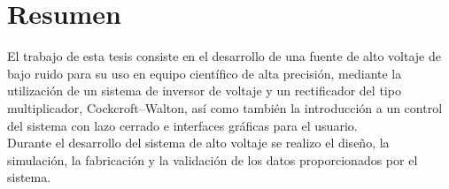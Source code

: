 



\chapter{Resumen} %

El trabajo de esta tesis consiste en el desarrollo de una fuente de alto voltaje de bajo ruido para su uso en equipo científico de alta precisión, mediante la utilización  de un sistema de inversor de voltaje y un rectificador del tipo multiplicador, Cockcroft–Walton, así como también la introducción a un control del sistema con lazo cerrado e interfaces gráficas para el usuario.\\

Durante el desarrollo del sistema de alto voltaje se realizo el diseño, la simulación, la fabricación y la validación de los datos proporcionados por el sistema.\\

